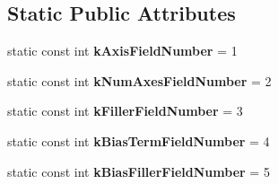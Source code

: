 \subsection*{Static Public Attributes}
\begin{DoxyCompactItemize}
\item 
\mbox{\label{classcaffe_1_1_scale_parameter_ad22dc636dc4bad19adb48f983e3bdb7c}} 
static const int {\bfseries k\+Axis\+Field\+Number} = 1
\item 
\mbox{\label{classcaffe_1_1_scale_parameter_a44ecfc72e072cbafdd979255b7862e14}} 
static const int {\bfseries k\+Num\+Axes\+Field\+Number} = 2
\item 
\mbox{\label{classcaffe_1_1_scale_parameter_a2584a7ef93e5d8f1439f903bad64585b}} 
static const int {\bfseries k\+Filler\+Field\+Number} = 3
\item 
\mbox{\label{classcaffe_1_1_scale_parameter_a1a79dd4556842f4f5158d025c93915e2}} 
static const int {\bfseries k\+Bias\+Term\+Field\+Number} = 4
\item 
\mbox{\label{classcaffe_1_1_scale_parameter_a74deb5dba8eeb0c05c209714dbfd3e3e}} 
static const int {\bfseries k\+Bias\+Filler\+Field\+Number} = 5
\end{DoxyCompactItemize}
